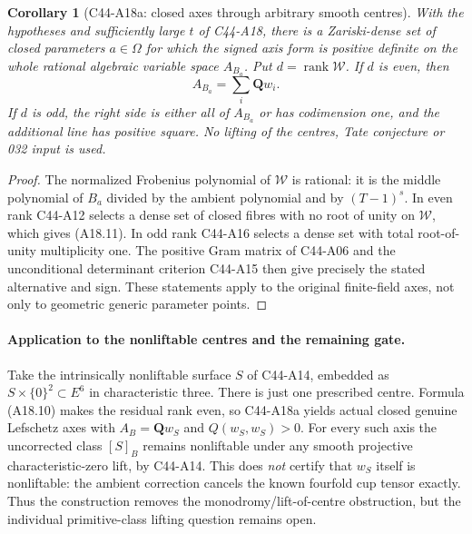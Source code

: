 \documentclass[11pt]{article}
\newtheorem{corollary}[theorem]{Corollary}
\theoremstyle{remark}\newtheorem{remark}[theorem]{Remark}
\begin{document}
\begin{corollary}[C44-A18a: closed axes through arbitrary smooth centres]
With the hypotheses and sufficiently large $t$ of C44-A18,
there is a Zariski-dense set of closed parameters $a\in\Omega$
for which the signed axis form is positive definite on the
\emph{whole} rational algebraic variable space $A_{B_a}$.
Put $d=\operatorname{rank}\mathcal W$.
If $d$ is even, then
\[
                         A_{B_a}=\sum_i\mathbf Q w_i.
                                                               \tag{A18.11}
\]
If $d$ is odd, the right side is either all of $A_{B_a}$ or has
codimension one, and the additional line has positive square.
No lifting of the centres, Tate conjecture or 032 input is used.
\end{corollary}

\begin{proof}
The normalized Frobenius polynomial of $\mathcal W$ is rational:
it is the middle polynomial of $B_a$ divided by the ambient
polynomial and by $(T-1)^s$. In even rank C44-A12 selects a dense
set of closed fibres with no root of unity on $\mathcal W$,
which gives (A18.11). In odd rank C44-A16 selects a dense set
with total root-of-unity multiplicity one. The positive Gram
matrix of C44-A06 and the unconditional determinant criterion
C44-A15 then give precisely the stated alternative and sign.
These statements apply to the original finite-field axes, not
only to geometric generic parameter points.
\end{proof}

\paragraph{Application to the nonliftable centres and the remaining gate.}
Take the intrinsically nonliftable surface $S$ of C44-A14,
embedded as $S\times\{0\}^2\subset E^6$ in characteristic three.
There is just one prescribed centre. Formula (A18.10) makes the
residual rank even, so C44-A18a yields actual closed genuine
Lefschetz axes with $A_B=\mathbf Q w_S$ and $Q(w_S,w_S)>0$.
For every such axis the uncorrected class $[S]_B$ remains
nonliftable under any smooth projective characteristic-zero
lift, by C44-A14. This does \emph{not} certify that $w_S$ itself
is nonliftable: the ambient correction cancels the known
fourfold cup tensor exactly. Thus the construction removes the
monodromy/lift-of-centre obstruction, but the individual
primitive-class lifting question remains open.
\end{document}

